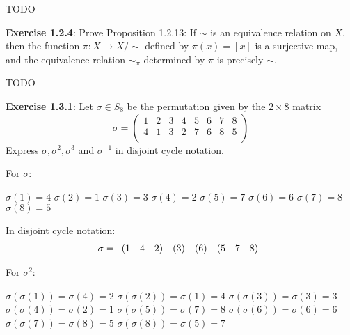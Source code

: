 \documentclass[a4paper]{article}
\begin{document}
\begin{myparindent}{0pt}
TODO \newline

\textbf{Exercise 1.2.4}:
Prove Proposition 1.2.13: If $\sim$ is an equivalence relation on $X$, then the function $\pi: X \rightarrow X/\sim$
defined by $\pi(x) = [x]$ is a surjective map, and the equivalence relation $\sim_{\pi}$ determined by $\pi$ is
precisely $\sim$. \newline

TODO \newline

\textbf{Exercise 1.3.1}:
Let $\sigma \in S_8$ be the permutation given by the $2 \times 8$ matrix \newline
\[
  \sigma =
  \begin{pmatrix}
    1 & 2 & 3 & 4 & 5 & 6 & 7 & 8 \\
    4 & 1 & 3 & 2 & 7 & 6 & 8 & 5 \\
  \end{pmatrix}
\]
Express $\sigma, \sigma^2, \sigma^3$ and $\sigma^{-1}$ in disjoint cycle notation. \newline

For $\sigma$:

$\sigma(1) = 4$ \newline
$\sigma(2) = 1$ \newline
$\sigma(3) = 3$ \newline
$\sigma(4) = 2$ \newline
$\sigma(5) = 7$ \newline
$\sigma(6) = 6$ \newline
$\sigma(7) = 8$ \newline
$\sigma(8) = 5$ \newline

In disjoint cycle notation:
\[
    \noindent \sigma = \begin{array}{rrr} (1 & 4 & 2) \end{array}
    \noindent \begin{array}{r} (3) \end{array}
    \noindent \begin{array}{r} (6) \end{array}
    \noindent \begin{array}{rrr} (5 & 7 & 8) \end{array}
\]

For $\sigma^2$:

$\sigma(\sigma(1)) = \sigma(4) = 2$ \newline
$\sigma(\sigma(2)) = \sigma(1) = 4$ \newline
$\sigma(\sigma(3)) = \sigma(3) = 3$ \newline
$\sigma(\sigma(4)) = \sigma(2) = 1$ \newline
$\sigma(\sigma(5)) = \sigma(7) = 8$ \newline
$\sigma(\sigma(6)) = \sigma(6) = 6$ \newline
$\sigma(\sigma(7)) = \sigma(8) = 5$ \newline
$\sigma(\sigma(8)) = \sigma(5) = 7$ \newline


\end{myparindent}
\end{document}
